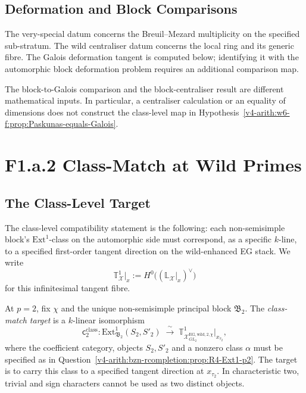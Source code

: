 \subsection{Deformation and Block Comparisons}

The very-special datum concerns the Breuil--Mezard multiplicity on the
specified sub-stratum. The wild centraliser datum concerns the local ring
and its generic fibre. The Galois deformation tangent is computed below;
identifying it with the automorphic block deformation problem requires
an additional comparison map.

The block-to-Galois comparison and the block-centraliser result
are different mathematical inputs. In particular, a centraliser
calculation or an equality of dimensions does not construct the
class-level map in
Hypothesis~\ref{v4-arith:w6-f:prop:Paskunas-equals-Galois}.

\section{F1.a.2 Class-Match at Wild Primes}
\label{v4-arith:w6-f:class-match}

\subsection{The Class-Level Target}

The class-level compatibility statement is the following: each
non-semisimple block's \(\mathrm{Ext}^{1}\)-class on the automorphic side
must correspond, as a specific \(k\)-line, to a specified first-order
tangent direction on the wild-enhanced EG stack.
We write
\[
\mathbb{T}^{1}_{\mathcal X}|_{x}:=
H^{0}\bigl((\mathbb L_{\mathcal X}|_{x})^{\vee}\bigr)
\]
for this infinitesimal tangent fibre.

\begin{definition}[the class-match target, \(p=2\)]
\label{v4-arith:w6-f:def:class-match-p2}
At \(p=2\), fix \(\chi\) and the unique
non-semisimple principal block \(\mathfrak{B}_{2}\). The
\emph{class-match target} is a \(k\)-linear isomorphism
\begin{equation}
\label{v4-arith:w6-f:eq:class-match-p2}
\mathsf{c}^{\mathrm{class}}_{2}\colon
\mathrm{Ext}^{1}_{\mathfrak{B}_{2}}(S_2,S'_2)
\;\xrightarrow{\;\sim\;}\;
\mathbb{T}^{1}_{\mathcal{X}^{\mathrm{EG,wild},2,\chi}_{GL_{2}}}\big|_{x_{\tau_{2}}},
\end{equation}
where the coefficient category, objects \(S_2,S'_2\) and a
nonzero class \(\alpha\) must be specified as in
Question~\ref{v4-arith:bzn-rcompletion:prop:R4-Ext1-p2}.
The target is to carry this class to a specified tangent direction
at \(x_{\tau_2}\). In characteristic two, trivial and sign
characters cannot be used as two distinct objects.
\end{definition}

